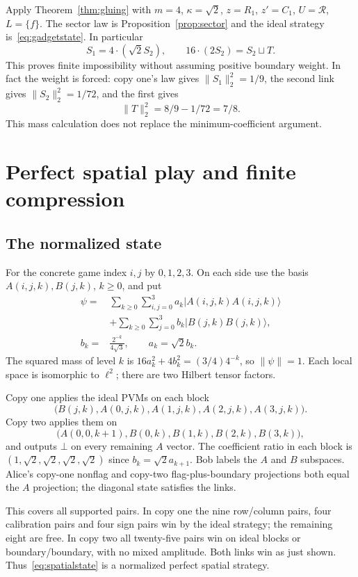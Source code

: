 \documentclass[11pt]{article}
\theoremstyle{definition}
\newcommand{\sq}{\sqcup}
\newcommand{\mult}[2]{#1\mathbin{\cdot}#2}
\begin{document}
Apply Theorem~\ref{thm:gluing} with $m=4$, $\kappa=\sqrt2$, $z=R_1$, $z'=C_1$, $U=\mathcal R$, $L=\{f\}$. The sector law is Proposition~\ref{prop:sector} and the ideal strategy is~\eqref{eq:gadgetstate}. In particular
\begin{equation}\label{eq:chain}
S_1=\mult{4}{(\sqrt2S_2)},\qquad \mult{16}{(2S_2)}=S_2\sq T.
\end{equation}
This proves finite impossibility without assuming positive boundary weight. In fact the weight is forced: copy one's law gives $\|S_1\|_2^2=1/9$, the second link gives $\|S_2\|_2^2=1/72$, and the first gives
\begin{equation}\label{eq:boundarymass}
\|T\|_2^2=8/9-1/72=7/8.
\end{equation}
This mass calculation does not replace the minimum-coefficient argument.

\section{Perfect spatial play and finite compression}\label{sec:strategy}
\subsection{The normalized state}
For the concrete game index $i,j$ by $0,1,2,3$. On each side use the basis $A(i,j,k),B(j,k)$, $k\geq0$, and put
\begin{align}\label{eq:spatialstate}
\psi={}&\sum_{k\geq0}\sum_{i,j=0}^3a_k|A(i,j,k)A(i,j,k)\rangle\nonumber\\
&+\sum_{k\geq0}\sum_{j=0}^3b_k|B(j,k)B(j,k)\rangle,\\
b_k={}&\frac{2^{-k}}{4\sqrt3},\qquad a_k=\sqrt2b_k.\nonumber
\end{align}
The squared mass of level $k$ is $16a_k^2+4b_k^2=(3/4)4^{-k}$, so $\|\psi\|=1$. Each local space is isomorphic to $\ell^2$; there are two Hilbert tensor factors.

Copy one applies the ideal PVMs on each block
\[
\bigl(B(j,k),A(0,j,k),A(1,j,k),A(2,j,k),A(3,j,k)\bigr).
\]
Copy two applies them on
\[
\bigl(A(0,0,k+1),B(0,k),B(1,k),B(2,k),B(3,k)\bigr),
\]
and outputs $\bot$ on every remaining $A$ vector. The coefficient ratio in each block is $(1,\sqrt2,\sqrt2,\sqrt2,\sqrt2)$ since $b_k=\sqrt2a_{k+1}$. Bob labels the $A$ and $B$ subspaces. Alice's copy-one nonflag and copy-two flag-plus-boundary projections both equal the $A$ projection; the diagonal state satisfies the links.

This covers all supported pairs. In copy one the nine row/column pairs, four calibration pairs and four sign pairs win by the ideal strategy; the remaining eight are free. In copy two all twenty-five pairs win on ideal blocks or boundary/boundary, with no mixed amplitude. Both links win as just shown. Thus~\eqref{eq:spatialstate} is a normalized perfect spatial strategy.
\end{document}
